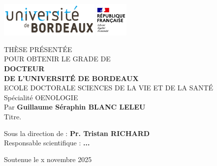 \pagestyle{empty}
{
  \includegraphics[height=1.7cm]{0_Liminaires/Images/UBX_logo.png}\hfill
  \includegraphics[height=1.7cm]{0_Liminaires/Images/RF.png}\hfill %
  
  \vspace{0.5cm}
  
  \begin{center}
  \linespread{1.6}\selectfont %
  \begin{Large}
  THÈSE PRÉSENTÉE\\
  POUR OBTENIR LE GRADE DE \\
  {\LARGE \textbf{DOCTEUR\\DE L'UNIVERSITÉ DE BORDEAUX}}\\
  \vspace{0.55cm}
  ECOLE DOCTORALE SCIENCES DE LA VIE ET DE LA SANTÉ\\
  {\normalsize Spécialité OENOLOGIE} \\
  \vspace{0.55cm}
  Par \textbf{Guillaume Séraphin BLANC LELEU} \\
  \vspace{0.55cm}
  {\Large Titre.}
  \end{Large}
  
  \vspace{0.55cm}
  
  \linespread{1.05}\selectfont
  {\normalsize
  Sous la direction de : \textbf{Pr. Tristan RICHARD}\\
  Responsable scientifique : \textbf{...}
  }
  \end{center}
  
  \vfill
  
  \begin{center}
  {\large Soutenue le x novembre 2025 }\\    
  \end{center}
  
}
